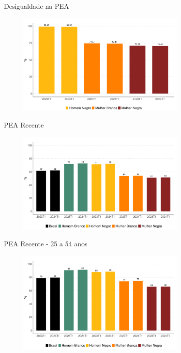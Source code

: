\documentclass[10pt, xcolor=x11names,compress]{beamer}
\begin{document}
	\begin{frame}{Desigualdade na PEA}
		\begin{figure}
			\centering
			\includegraphics[width = 0.75\textwidth]{figures_output/frac_pea.pdf}
		\end{figure}
	\end{frame}	
	
	\begin{frame}{PEA Recente}
		\begin{figure}
			\centering
			\includegraphics[width = 0.75\textwidth]{figures_output/pea.pdf}
		\end{figure}
	\end{frame}	
	
	\begin{frame}{PEA Recente - 25 a 54 anos}
		\begin{figure}
			\centering
			\includegraphics[width = 0.75\textwidth]{figures_output/pea_adult.pdf}
		\end{figure}
	\end{frame}	
	
\end{document}

